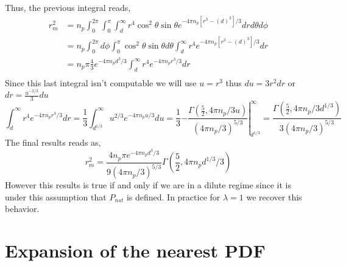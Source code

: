 Thus, the previous integral reads, 
\begin{align*}
    r_m^2 
    &= n_p \int_{0}^{2\pi}\int_{0}^{\pi}\int_{d}^{\infty}
     r^4 \cos^2\theta\sin\theta e^{-4\pi n_p [r^3- (d)^3]/3}
    drd\theta d\phi\\
    &= n_p \int_{0}^{2\pi}d\phi 
    \int_{0}^{\pi} \cos^2\theta\sin\theta d\theta 
    \int_{d}^{\infty}
     r^4  e^{-4\pi n_p [r^3- (d)^3]/3} dr\\
    &= n_p \pi
    \frac{4}{3} 
    e^{-4\pi n_p d^3 /3}
    \int_{d}^{\infty}
     r^4  e^{-4\pi n_p r^3 /3}
      dr\\
\end{align*}
Since this last integral isn't computable we will use $u = r^3$ thus $du = 3 r^2 dr$ or $dr = \frac{u^{-2/3}}{3} du$
\begin{equation*}
    \int_{d}^{\infty}
     r^4  e^{-4\pi n_p r^3 /3}
      dr
      = \frac{1}{3} 
      \int_{d^{1/3}}^{\infty}
        u^{2/3}  e^{-4\pi n_p u /3}
      du
      = \frac{1}{3}\left.
        -\frac{\Gamma(\frac{5}{2}, 4\pi n_p/3 u )}{(4\pi n_p/3)^{5/3}}
        \right|_{d^{1/3}}^\infty
      = 
        \frac{\Gamma(\frac{5}{2}, 4\pi n_p/3 d^{1/3} )}{3(4\pi n_p/3)^{5/3}}
\end{equation*}
The final results reads as,
\begin{equation*}
    r_m^2 =
    \frac{4n_p \pi e^{-4\pi n_p d^3 /3}}{9(4\pi n_p / 3)^{5/3}}
    \Gamma\left(\frac{5}{2}, 4\pi n_p d^{1/3} / 3 \right)
\end{equation*}
However this results is true if and only if we are in a dilute regime since it is under this assumption that $P_{nst}$ is defined. 
In practice for $\lambda = 1$ we recover this behavior. 

\section{Expansion of the nearest PDF}

